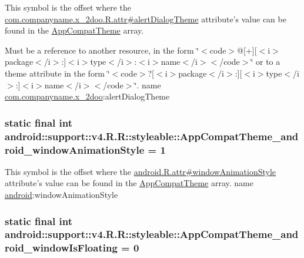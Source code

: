 This symbol is the offset where the \hyperlink{classcom_1_1companyname_1_1x__2doo_1_1_r_1_1attr_9a4df1fe76c41f0e6ca79ef95c260cec}{com.companyname.x\_\-2doo.R.attr\#alertDialogTheme} attribute's value can be found in the \hyperlink{classandroid_1_1support_1_1v4_1_1_r_1_1styleable_0873e92ba21076bb5a4aeadeb7f5779f}{AppCompatTheme} array.

Must be a reference to another resource, in the form \char`\"{}$<$code$>$@\mbox{[}+\mbox{]}\mbox{[}$<$i$>$package$<$/i$>$:\mbox{]}$<$i$>$type$<$/i$>$:$<$i$>$name$<$/i$>$$<$/code$>$\char`\"{} or to a theme attribute in the form \char`\"{}$<$code$>$?\mbox{[}$<$i$>$package$<$/i$>$:\mbox{]}\mbox{[}$<$i$>$type$<$/i$>$:\mbox{]}$<$i$>$name$<$/i$>$$<$/code$>$\char`\"{}.  name \hyperlink{namespacecom_1_1companyname_1_1x__2doo}{com.companyname.x\_\-2doo}:alertDialogTheme \hypertarget{classandroid_1_1support_1_1v4_1_1_r_1_1styleable_1d77731fad30decfb99a3a8e55c35700}{
\subsubsection[{AppCompatTheme\_\-android\_\-windowAnimationStyle}]{\setlength{\rightskip}{0pt plus 5cm}static final int android::support::v4.R.R::styleable::AppCompatTheme\_\-android\_\-windowAnimationStyle = 1}}
\label{classandroid_1_1support_1_1v4_1_1_r_1_1styleable_1d77731fad30decfb99a3a8e55c35700}


This symbol is the offset where the \hyperlink{}{android.R.attr\#windowAnimationStyle} attribute's value can be found in the \hyperlink{classandroid_1_1support_1_1v4_1_1_r_1_1styleable_0873e92ba21076bb5a4aeadeb7f5779f}{AppCompatTheme} array.  name \hyperlink{namespaceandroid}{android}:windowAnimationStyle \hypertarget{classandroid_1_1support_1_1v4_1_1_r_1_1styleable_9692aa9adae84384d1c4a70481a486a6}{
\subsubsection[{AppCompatTheme\_\-android\_\-windowIsFloating}]{\setlength{\rightskip}{0pt plus 5cm}static final int android::support::v4.R.R::styleable::AppCompatTheme\_\-android\_\-windowIsFloating = 0}}
\label{classandroid_1_1support_1_1v4_1_1_r_1_1styleable_9692aa9adae84384d1c4a70481a486a6}


